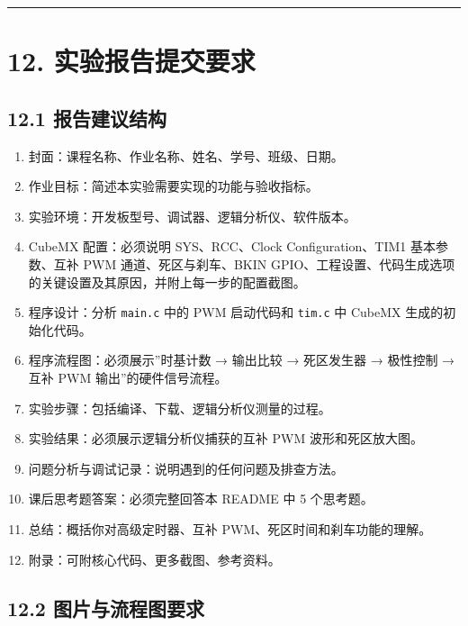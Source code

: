 \documentclass[
  chinese,
  UTF8,
  oneside,
  openany]{ctexbook}
\providecommand{\tightlist}{%
  \setlength{\itemsep}{0pt}\setlength{\parskip}{0pt}}
\begin{document}
\begin{center}\rule{0.5\linewidth}{0.5pt}\end{center}

\section{12.
实验报告提交要求}\label{ux5b9eux9a8cux62a5ux544aux63d0ux4ea4ux8981ux6c42-5}

\subsection{12.1
报告建议结构}\label{ux62a5ux544aux5efaux8baeux7ed3ux6784-8}

\begin{enumerate}
\def\labelenumi{\arabic{enumi}.}
\tightlist
\item
  封面：课程名称、作业名称、姓名、学号、班级、日期。
\item
  作业目标：简述本实验需要实现的功能与验收指标。
\item
  实验环境：开发板型号、调试器、逻辑分析仪、软件版本。
\item
  CubeMX 配置：必须说明 SYS、RCC、Clock Configuration、TIM1
  基本参数、互补 PWM 通道、死区与刹车、BKIN
  GPIO、工程设置、代码生成选项的关键设置及其原因，并附上每一步的配置截图。
\item
  程序设计：分析 \texttt{main.c} 中的 PWM 启动代码和 \texttt{tim.c} 中
  CubeMX 生成的初始化代码。
\item
  程序流程图：必须展示''时基计数 → 输出比较 → 死区发生器 → 极性控制 →
  互补 PWM 输出''的硬件信号流程。
\item
  实验步骤：包括编译、下载、逻辑分析仪测量的过程。
\item
  实验结果：必须展示逻辑分析仪捕获的互补 PWM 波形和死区放大图。
\item
  问题分析与调试记录：说明遇到的任何问题及排查方法。
\item
  课后思考题答案：必须完整回答本 README 中 5 个思考题。
\item
  总结：概括你对高级定时器、互补 PWM、死区时间和刹车功能的理解。
\item
  附录：可附核心代码、更多截图、参考资料。
\end{enumerate}

\subsection{12.2
图片与流程图要求}\label{ux56feux7247ux4e0eux6d41ux7a0bux56feux8981ux6c42-8}
\end{document}
